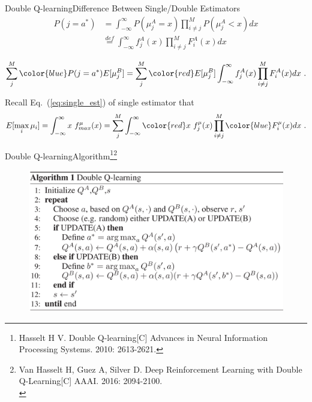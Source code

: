 \documentclass{beamer}
\newcommand{\red}[1]{{\color{red} #1}}
\newcommand{\blue}[1]{{\color{blue} #1}}
\begin{document}
\begin{frame}{Double Q-learning}{Difference Between Single/Double Estimators}
	\begin{equation}
	\begin{aligned}
		P(j=a^*) &= \int_{-\infty}^{\infty} P(\mu_j^A = x) \prod_{i\neq j}^M P(\mu_j^A <x) dx \\
		&\overset{def}{=} \int_{-\infty}^{\infty} f_j^A(x) \prod_{i\neq j}^M F_i^A(x) dx 
	\end{aligned}
	\end{equation}
	
	\begin{equation}\label{eq:double_est}
		\sum_j^M \blue{P(j=a^*)} E[\mu_j^B] = \sum_j^M \red{E[\mu_j^B]} \int_{-\infty}^{\infty} f_j^A(x) \prod_{i\neq j}^M F_i^A(x) dx ~.
	\end{equation}
	
	Recall Eq.~(\ref{eq:single_est}) of single estimator that
	\begin{equation}\nonumber
	E[\max_i \mu_i] = \int_{-\infty}^{\infty} x ~f_{max}^{\mu}(x) = \sum_j^M \int_{-\infty}^{\infty} \red{x} ~f_j^{\mu}(x) \prod_{i\neq j}^M \blue{F_i^{\mu}(x)} dx ~.
	\end{equation}
\end{frame}


\begin{frame}{Double Q-learning}{Algorithm\footnote{\tiny{Hasselt H V. Double Q-learning[C] Advances in Neural Information Processing Systems. 2010: 2613-2621.}}\footnote{\tiny{Van Hasselt H, Guez A, Silver D. Deep Reinforcement Learning with Double Q-Learning[C] AAAI. 2016: 2094-2100.}\\}}
	\begin{figure}[t]
		\includegraphics[width=0.7\columnwidth]{figures/double-q-learning-alg.jpg}
	\end{figure}
\end{frame}
\end{document}
